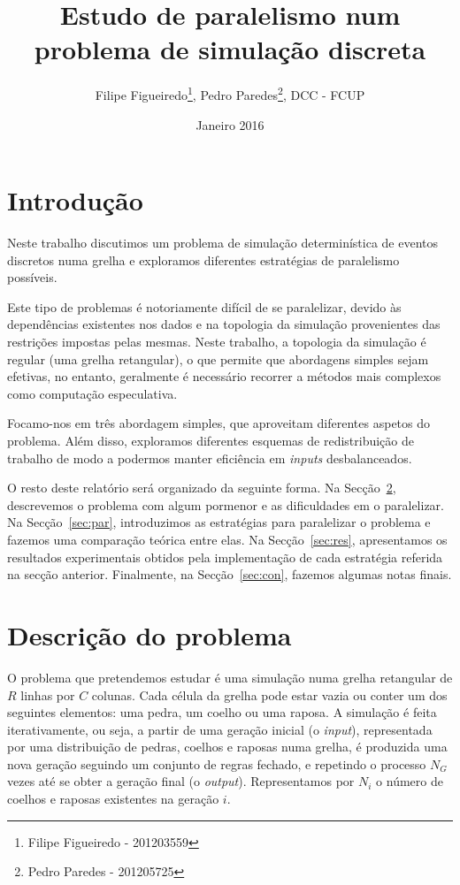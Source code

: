 \documentclass[10pt,a4paper,oneside]{article}
\title{Estudo de paralelismo num problema de simulação discreta}
\author{Filipe Figueiredo\footnote{Filipe Figueiredo - 201203559},
  Pedro Paredes\footnote{Pedro Paredes - 201205725}, DCC - FCUP}
\date{Janeiro 2016}
\begin{document}
\maketitle


\section{Introdução}
\label{sec:intro}
Neste trabalho discutimos um problema de simulação determinística de
eventos discretos numa grelha e exploramos diferentes estratégias de
paralelismo possíveis.

Este tipo de problemas é notoriamente difícil de se paralelizar,
devido às dependências existentes nos dados e na topologia da
simulação provenientes das restrições impostas pelas mesmas. Neste
trabalho, a topologia da simulação é regular (uma grelha retangular),
o que permite que abordagens simples sejam efetivas, no entanto,
geralmente é necessário recorrer a métodos mais complexos como
computação especulativa.

Focamo-nos em três abordagem simples, que aproveitam diferentes
aspetos do problema. Além disso, exploramos diferentes esquemas de
redistribuição de trabalho de modo a podermos manter eficiência em
\textit{inputs} desbalanceados.

O resto deste relatório será organizado da seguinte forma. Na
Secção~\ref{sec:prob}, descrevemos o problema com algum pormenor e as
dificuldades em o paralelizar. Na Secção~\ref{sec:par}, introduzimos as
estratégias para paralelizar o problema e fazemos uma comparação
teórica entre elas. Na Secção~\ref{sec:res}, apresentamos os resultados
experimentais obtidos pela implementação de cada estratégia referida
na secção anterior. Finalmente, na Secção~\ref{sec:con}, fazemos
algumas notas finais.


\section{Descrição do problema}
\label{sec:prob}
O problema que pretendemos estudar é uma simulação numa grelha
retangular de $R$ linhas por $C$ colunas. Cada célula da grelha pode
estar vazia ou conter um dos seguintes elementos: uma pedra, um coelho
ou uma raposa. A simulação é feita iterativamente, ou seja, a partir
de uma geração inicial (o \textit{input}), representada por uma
distribuição de pedras, coelhos e raposas numa grelha, é produzida uma
nova geração seguindo um conjunto de regras fechado, e repetindo o
processo $N_G$ vezes até se obter a geração final (o
\textit{output}). Representamos por $N_i$ o número de coelhos e
raposas existentes na geração $i$.
\end{document}

